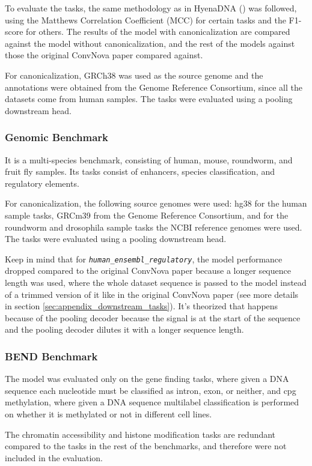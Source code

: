 \documentclass[   ]{article}
\let\oldtexttt\texttt
\renewcommand{\texttt}[1]{\oldtexttt{\itshape #1}}
\begin{document}
To evaluate the tasks, the same methodology as in HyenaDNA
(\citep{nguyenHyenaDNALongRangeGenomic2023}) was followed, using the
Matthews Correlation Coefficient (MCC) for certain tasks and the
F1-score for others. The results of the model with canonicalization are
compared against the model without canonicalization, and the rest of the
models against those the original ConvNova paper compared against.

For canonicalization, GRCh38 was used as the source genome and the
annotations were obtained from the Genome Reference Consortium, since all the datasets come from human samples. The tasks were evaluated using a pooling downstream head.

\subsubsection{Genomic Benchmark}
It is a multi-species benchmark, consisting of human, mouse,
roundworm, and fruit fly samples. Its tasks consist of enhancers,
species classification, and regulatory elements.

For canonicalization, the following source genomes were used: hg38 for
the human sample tasks, GRCm39 from the Genome Reference Consortium, and for the roundworm and drosophila sample
tasks the NCBI reference genomes were used. The tasks were evaluated using a pooling downstream head.

Keep in mind that for \texttt{human\_ensembl\_regulatory}, the model performance dropped compared to the original ConvNova paper because a longer sequence length was used, where the whole dataset sequence is passed to the model instead of a trimmed version of it like in the original ConvNova paper (see more details in section \ref{sec:appendix_downstream_tasks}). It's theorized that happens because of the pooling decoder because the signal is at the start of the sequence and the pooling decoder dilutes it with a longer sequence length.

\subsubsection{BEND Benchmark}
The model was evaluated only on the gene finding tasks, where given a DNA sequence
each nucleotide must be classified as intron, exon, or neither, and cpg
methylation, where given a DNA sequence multilabel classification is
performed on whether it is methylated or not in different cell lines.

The chromatin accessibility and histone modification tasks are redundant
compared to the tasks in the rest of the benchmarks, and therefore were
not included in the evaluation.
\end{document}
